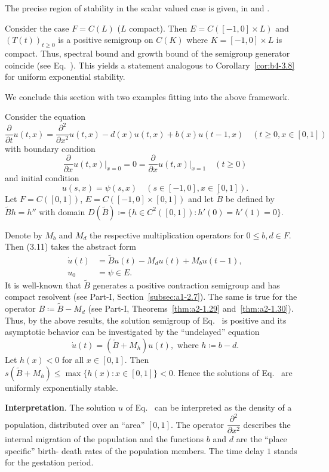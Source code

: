 The precise region of stability in the scalar valued case is given, \eg in \textcite{hadeler:1978}  and  \textcite[p.107ff]{hale:1977}.

\begin{remark*}
	Consider the case $F = C(L)$ ($L$ compact).
	Then $E = C([-1,0] \times L)$ and $(T(t))_{t\geq0}$ is a positive semigroup on $C(K)$ where $K = [-1,0] \times L$ is compact. 
	Thus, spectral bound and growth bound of the semigroup generator coincide (see Eq.~). 
	This yields a statement analogous to Corollary~\ref{cor:b4-3.8} for uniform exponential stability.
\end{remark*}
We conclude this section with two examples fitting into the above framework.
\begin{example}\label{ex:b4-3.11}
	Consider the equation
\[
    \frac{\partial}{\partial t}u(t,x) = 
    \frac{\partial^2}{\partial x^2}u(t,x) - d(x)u(t,x) + b(x)u(t-1,x) \quad (t\geq0,x\in[0,1])
\]
with boundary condition
\begin{equation}\label{eq:b4-3.11}
    \frac{\partial}{\partial x}u(t,x)\big|_{x=0} = 0 = \frac{\partial}{\partial x}u(t,x)\big|_{x=1} \quad (t\geq0)
\end{equation}
and initial condition
\[
	u(s,x) = \psi(s,x) \quad (s\in[-1,0],x\in[0,1]) .
\]
Let $F = C([0,1])$, $E = C([-1,0] \times [0,1] )$ and let $\tilde{B}$ be defined by $\tilde{B}h = h''$ with domain $D(\tilde{B}) \coloneq  \{h \in C^2([0,1]) \colon h'(0) = h'(1) = 0\}$.

Denote by $M_b$ and $M_d$ the respective multiplication operators for $0 \leq b,d \in F$. 
Then (3.11) takes the abstract form
\begin{align*}
	\dot{u}(t) &= \tilde{B}u(t) - M_du(t) + M_bu(t-1) ,\\
	u_0 &= \psi \in E .
\end{align*}
It is well-known that $\tilde{B}$ generates a positive contraction semigroup and has compact resolvent (see Part-I, Section~\ref{subsec:a1-2.7}). 
The same is true for the operator $B  \coloneq  \tilde{B} - M_d$ (see Part-I, Theorems~\ref{thm:a2-1.29} and~\ref{thm:a2-1.30}). 
Thus, by the above results, the solution semigroup of Eq.~ is positive and its asymptotic behavior can be investigated by the \enquote{undelayed} equation
\[
\dot{u}(t) = (\tilde{B} + M_h)u(t) , \text{ where } h \coloneq  b - d .
\]
Let $h(x) < 0$ for all $x \in [0,1]$.
Then $s(\tilde{B} + M_h) \leq \max\{h(x) \colon x \in [0,1]\} < 0$. 
Hence the solutions of Eq.~ are uniformly exponentially stable.
\end{example}
\textbf{Interpretation}.\quad
	The solution $u$ of Eq.~ can be interpreted as the density of a population, distributed over an \enquote{area} $[0,1]$.
	The operator $\dfrac{\partial^2}{\partial x^2}$ describes the internal migration of the population and the functions $b$ and $d$ are the \enquote{place specific} birth- \resp death rates of the population members. 
	The time delay $1$ stands for the gestation period. 
	
